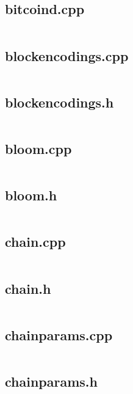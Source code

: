 \documentclass{article}
\begin{document}
\subsection{bitcoind.cpp}
\inputminted{cpp}{/home/dufferzafar/dev/@clones/bitcoin/src/bitcoind.cpp}
\newpage

\subsection{blockencodings.cpp}
\inputminted{cpp}{/home/dufferzafar/dev/@clones/bitcoin/src/blockencodings.cpp}
\newpage

\subsection{blockencodings.h}
\inputminted{cpp}{/home/dufferzafar/dev/@clones/bitcoin/src/blockencodings.h}
\newpage

\subsection{bloom.cpp}
\inputminted{cpp}{/home/dufferzafar/dev/@clones/bitcoin/src/bloom.cpp}
\newpage

\subsection{bloom.h}
\inputminted{cpp}{/home/dufferzafar/dev/@clones/bitcoin/src/bloom.h}
\newpage

\subsection{chain.cpp}
\inputminted{cpp}{/home/dufferzafar/dev/@clones/bitcoin/src/chain.cpp}
\newpage

\subsection{chain.h}
\inputminted{cpp}{/home/dufferzafar/dev/@clones/bitcoin/src/chain.h}
\newpage

\subsection{chainparams.cpp}
\inputminted{cpp}{/home/dufferzafar/dev/@clones/bitcoin/src/chainparams.cpp}
\newpage

\subsection{chainparams.h}
\inputminted{cpp}{/home/dufferzafar/dev/@clones/bitcoin/src/chainparams.h}
\newpage
\end{document}
